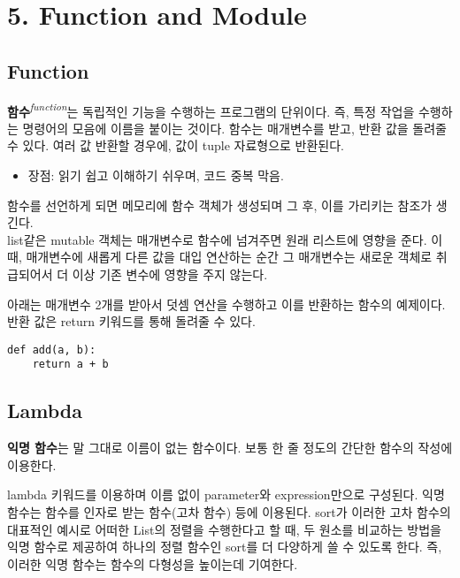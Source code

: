 \section[{5. Function and Module - {\it 함수와 모듈}}]{5. Function and Module}

\subsection{Function}

\textbf{함수}\textit{\textsuperscript{function}}는 독립적인 기능을 수행하는 프로그램의 단위이다. 즉, 특정 작업을 수행하는 명령어의 모음에 이름을 붙이는 것이다. 함수는 매개변수를 받고, 반환 값을 돌려줄 수 있다. 여러 값 반환할 경우에, 값이 tuple 자료형으로 반환된다.

\begin{itemize}
    \item 장점: 읽기 쉽고 이해하기 쉬우며, 코드 중복 막음.
\end{itemize}
함수를 선언하게 되면 메모리에 함수 객체가 생성되며 그 후, 이를 가리키는 참조가 생긴다.\\
list같은 mutable 객체는 매개변수로 함수에 넘겨주면 원래 리스트에 영향을 준다. 이때, 매개변수에 새롭게 다른 값을 대입 연산하는 순간 그 매개변수는 새로운 객체로 취급되어서 더 이상 기존 변수에 영향을 주지 않는다.

아래는 매개변수 2개를 받아서 덧셈 연산을 수행하고 이를 반환하는 함수의 예제이다. 반환 값은 return 키워드를 통해 돌려줄 수 있다.

\begin{tcolorbox}[colframe=black, colback=white]
\begin{verbatim}
def add(a, b):
    return a + b
\end{verbatim}
\end{tcolorbox}

\subsection{Lambda}

\textbf{익명 함수}는 말 그대로 이름이 없는 함수이다. 보통 한 줄 정도의 간단한 함수의 작성에 이용한다.

lambda 키워드를 이용하며 이름 없이 parameter와 expression만으로 구성된다. 익명 함수는 함수를 인자로 받는 함수(고차 함수) 등에 이용된다. sort가 이러한 고차 함수의 대표적인 예시로 어떠한 List의 정렬을 수행한다고 할 때, 두 원소를 비교하는 방법을 익명 함수로 제공하여 하나의 정렬 함수인 sort를 더 다양하게 쓸 수 있도록 한다. 즉, 이러한 익명 함수는 함수의 다형성을 높이는데 기여한다.

